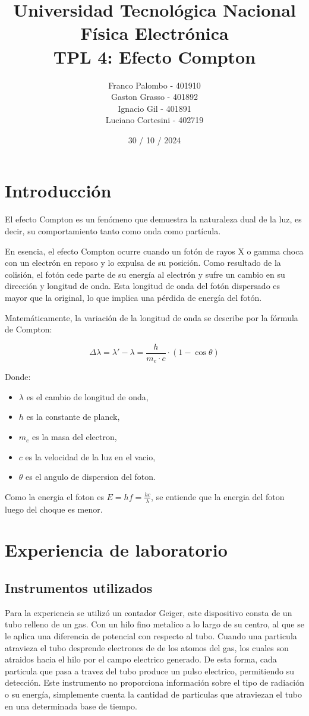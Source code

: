 \documentclass[a4paper,12pt]{report}
\title{%
  \fontsize{25}{0}\selectfont Universidad Tecnológica Nacional \\
  \fontsize{22}{30}\selectfont Física Electrónica \\
  \fontsize{18}{25}\selectfont TPL 4: Efecto Compton
}
\author{
Franco Palombo - 401910\\
Gaston Grasso - 401892\\
Ignacio Gil - 401891\\
Luciano Cortesini - 402719\\
}
\date{30 / 10 / 2024}
\begin{document}
\maketitle

\chapter{Introducción}
  El efecto Compton es un fenómeno que demuestra la naturaleza dual de la luz, es decir, su comportamiento tanto como
  onda como partícula.

  En esencia, el efecto Compton ocurre cuando un fotón de rayos X o gamma choca con un electrón en
  reposo y lo expulsa de su posición. Como resultado de la colisión, el fotón cede parte de su energía al electrón y
  sufre un cambio en su dirección y longitud de onda. Esta longitud de onda del fotón dispersado es mayor que la
  original, lo que implica una pérdida de energía del fotón.

  Matemáticamente, la variación de la longitud de onda se describe por la fórmula de Compton:

  $$\Delta \lambda = \lambda' - \lambda = \frac{h}{m_e \cdot c} \cdot (1 - \cos \theta)$$

  Donde:
  \begin{itemize}
    \item $\lambda$ es el cambio de longitud de onda,
    \item $h$ es la constante de planck,
    \item $m_e$ es la masa del electron,
    \item $c$ es la velocidad de la luz en el vacio,
    \item $\theta$ es el angulo de dispersion del foton.
  \end{itemize}

  Como la energia el foton es $E = hf = \frac{hc}{\lambda}$, se entiende que la energia del foton luego del choque
  es menor.

\chapter{Experiencia de laboratorio}
  \section{Instrumentos utilizados}
    Para la experiencia se utilizó un contador Geiger, este dispositivo consta de un tubo relleno de un gas. Con un hilo fino metalico a lo largo de su centro,
    al que se le aplica una diferencia de potencial con respecto al tubo. Cuando una particula atravieza el tubo desprende electrones de
    de los atomos del gas, los cuales son atraidos hacia el hilo por el campo electrico generado. De esta forma, cada particula que pasa a travez del tubo produce
    un pulso electrico, permitiendo su detección. Este instrumento no proporciona información sobre el tipo de radiación o su energía, simplemente cuenta la cantidad
    de particulas que atraviezan el tubo en una determinada base de tiempo.
\end{document}
